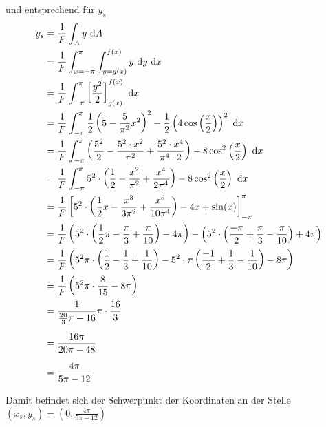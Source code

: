 \documentclass[main.tex]{subfiles}
\begin{document}
und entsprechend für $y_s$
\begin{align*}
    y_s &= \frac{1}{F} \int_{A}y ~\mathrm{d}A \\
        &= \frac{1}{F} \int_{x=-\pi}^{\pi} \int_{y=g(x)}^{f(x)} y ~\mathrm{d}y ~\mathrm{d}x \\
        &= \frac{1}{F} \int_{-\pi}^{\pi} \left[ \frac{y^2}{2} \right]_{g(x)}^{f(x)} ~\mathrm{d}x \\
        &= \frac{1}{F} \int_{-\pi}^{\pi} \frac{1}{2} \left(5 - \frac{5}{\pi^2} x^2 \right)^2 - \frac{1}{2}\left(4 \cos \left( \frac{x}{2} \right)\right)^2 ~\mathrm{d}x \\
        &= \frac{1}{F} \int_{-\pi}^{\pi} \left(\frac{5^2}{2} - \frac{5^2\cdot x^2}{\pi^2} + \frac{5^2\cdot x^4}{\pi^4\cdot 2} \right) - 8 \cos^2 \left( \frac{x}{2} \right) ~\mathrm{d}x \\
        &= \frac{1}{F} \int_{-\pi}^{\pi} 5^2\cdot \left(\frac{1}{2} - \frac{x^2}{\pi^2} + \frac{x^4}{2\pi^4} \right) - 8 \cos^2 \left( \frac{x}{2} \right) ~\mathrm{d}x \\
        &= \frac{1}{F} \left[ 5^2\cdot \left(\frac{1}{2} x - \frac{x^3}{3\pi^2} + \frac{x^5}{10\pi^4} \right) - 4x +\sin(x) \right]_{-\pi}^{\pi} \\
        &= \frac{1}{F} \left( 5^2\cdot \left(\frac{1}{2} \pi - \frac{\pi}{3} + \frac{\pi}{10} \right) - 4\pi \right) 
            - \left( 5^2\cdot \left(\frac{-\pi}{2} + \frac{\pi}{3} - \frac{\pi}{10} \right) + 4\pi \right) \\
        &= \frac{1}{F} \left( 5^2 \pi \cdot \left(\frac{1}{2} - \frac{1}{3} + \frac{1}{10} \right) 
            - 5^2\cdot \pi \left(\frac{-1}{2} + \frac{1}{3} - \frac{1}{10} \right) - 8\pi \right)\\
        &= \frac{1}{F} \left( 5^2 \pi \cdot \frac{8}{15} - 8\pi \right) \\
        &= \frac{1}{\frac{20}{3} \pi - 16} \pi \cdot \frac{16}{3} \\[2mm]
        &= \frac{16\pi}{20\pi - 48} \\[2mm]
        &= \frac{4\pi}{5\pi - 12} \\
\end{align*}

Damit befindet sich der Schwerpunkt der Koordinaten an der Stelle $(x_s, y_s) = (0, \frac{4\pi}{5\pi - 12})$
\end{document}
